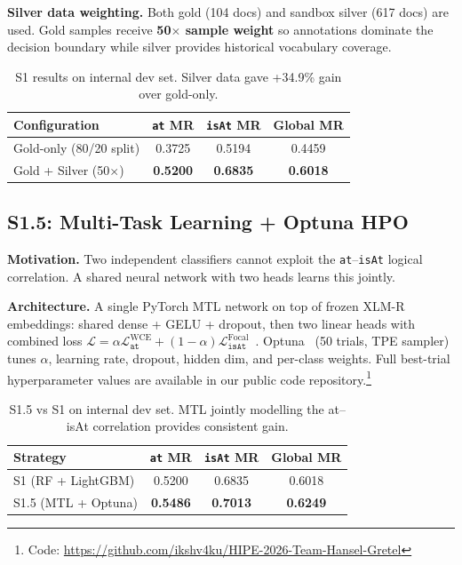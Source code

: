 \documentclass{ceurart}
\begin{document}
\textbf{Silver data weighting.} Both gold (104 docs) and sandbox silver (617 docs) are used. Gold samples receive \textbf{50$\times$ sample weight} so annotations dominate the decision boundary while silver provides historical vocabulary coverage.

\begin{table}[ht]
  \caption{S1 results on internal dev set. Silver data gave +34.9\% gain over gold-only.}
  \label{tab:s1}
  \centering
  \begin{tabular}{lccc}
    \toprule
    \textbf{Configuration} & \textbf{\texttt{at} MR} & \textbf{\texttt{isAt} MR} & \textbf{Global MR} \\
    \midrule
    Gold-only (80/20 split) & 0.3725 & 0.5194 & 0.4459 \\
    Gold + Silver (50$\times$) & \textbf{0.5200} & \textbf{0.6835} & \textbf{0.6018} \\
    \bottomrule
  \end{tabular}
\end{table}

\subsection{S1.5: Multi-Task Learning + Optuna HPO}

\textbf{Motivation.} Two independent classifiers cannot exploit the \texttt{at}--\texttt{isAt} logical correlation. A shared neural network with two heads learns this jointly.

\textbf{Architecture.} A single PyTorch MTL network on top of frozen XLM-R embeddings: shared dense + GELU + dropout, then two linear heads with combined loss $\mathcal{L} = \alpha \mathcal{L}_{\texttt{at}}^{\text{WCE}} + (1{-}\alpha) \mathcal{L}_{\texttt{isAt}}^{\text{Focal}}$~\cite{lin2017focal}. Optuna~\cite{akiba2019optuna} (50 trials, TPE sampler) tunes $\alpha$, learning rate, dropout, hidden dim, and per-class weights. Full best-trial hyperparameter values are available in our public code repository.\footnote{Code: \url{https://github.com/ikshv4ku/HIPE-2026-Team-Hansel-Gretel}}

\begin{table}[ht]
  \caption{S1.5 vs S1 on internal dev set. MTL jointly modelling the at--isAt correlation provides consistent gain.}
  \label{tab:s15}
  \centering
  \begin{tabular}{lccc}
    \toprule
    \textbf{Strategy} & \textbf{\texttt{at} MR} & \textbf{\texttt{isAt} MR} & \textbf{Global MR} \\
    \midrule
    S1 (RF + LightGBM) & 0.5200 & 0.6835 & 0.6018 \\
    S1.5 (MTL + Optuna) & \textbf{0.5486} & \textbf{0.7013} & \textbf{0.6249} \\
    \bottomrule
  \end{tabular}
\end{table}
\end{document}
